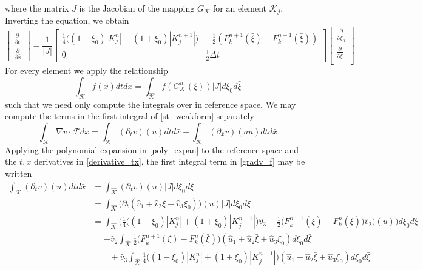 \documentclass[11pt, oneside]{article}   	%
\begin{document}
where the matrix $J$ is the Jacobian of the mapping $G_\mathcal{K}$ for an element $\mathcal{K}_j$.
Inverting the equation, we obtain
\begin{equation}\label{derivative_tx}
\begin{bmatrix}
	\frac{\partial}{\partial t}\\
	\frac{\partial}{\partial \bar{x}}
\end{bmatrix}
=
\frac{1}{|J|}
\begin{bmatrix}
	\frac{1}{4}\big( (1-\xi_0)|K_j^n| + (1+\xi_0)|K_j^{n+1}| \big) & -\frac{1}{2}(F_k^{n+1}(\bar{\xi}) - F_k^{n+1}(\bar{\xi})) \\
	0 & \frac{1}{2}\Delta t
\end{bmatrix}
\begin{bmatrix}
	\frac{\partial}{\partial \xi_0}\\
	\frac{\partial}{\partial \bar{\xi}}\\
\end{bmatrix}
\end{equation}
For every element we apply the relationship
\[ \int_{\mathcal{K}} f(x) dt d\bar{x} =  \int_{\hat{\mathcal{K}}} f(G_{\mathcal{K}}^n(\xi)) |J| d\xi_0 d\bar{\xi}  \]
such that we need only compute the integrals over in reference space.
We may compute the terms in the first integral of \eqref{st_weakform} separately 
\begin{equation}\label{gradv_f}
\int_{\mathcal{K}} \nabla v \cdot \mathcal{F} dx = \int_{\mathcal{K}} (\partial_t v)(u) dtd\bar{x} + \int_{\mathcal{K}} (\partial_{\bar{x}} v)(au) dtd\bar{x}
\end{equation}
Applying the polynomial expansion in \eqref{poly_expan} to the reference space and the $t,\bar{x}$ derivatives in \eqref{derivative_tx}, the first integral term in \eqref{gradv_f} may be written
\begin{equation}\label{div_v_1}
\begin{split}
\int_{\mathcal{K}} (\partial_t v)(u) dtd\bar{x}
	&= \int_{\mathcal{\hat{K}}} (\partial_t v)(u) |J| d\xi_0 d\bar{\xi}\\
	&= \int_{\mathcal{\hat{K}}} \big(\partial_t (\hat{v}_1 + \hat{v}_2 \bar{\xi} + \hat{v}_3 \xi_0)\big)(u) |J| d\xi_0 d\bar{\xi}\\
	&= \int_{\mathcal{\hat{K}}} \bigg( \frac{1}{4}\big((1-\xi_0)|K_j^n| + (1+\xi_0)|K_j^{n+1}|\big)\hat{v}_3 - \frac{1}{2}\big(F_k^{n+1}(\bar{\xi})-F_k^n(\bar{\xi})\big)\hat{v}_2\bigg)(u)) d\xi_0 d\bar{\xi}\\
	&= -\hat{v}_2 \int_{\mathcal{\hat{K}}}\frac{1}{2}\big(F_k^{n+1}(\xi)-F_k^n(\bar{\xi})\big) (\hat{u}_1 + \hat{u}_2\bar{\xi} + \hat{u}_3 \xi_0) d\xi_0 d\bar{\xi}\\
	&\qquad + \hat{v}_3 \int_{\mathcal{\hat{K}}}  \frac{1}{4}\big((1-\xi_0)|K_j^n| + (1+\xi_0)|K_j^{n+1}|\big) (\hat{u}_1 + \hat{u}_2\bar{\xi} + \hat{u}_3 \xi_0) d\xi_0 d\bar{\xi}
\end{split}
\end{equation}
\end{document}
